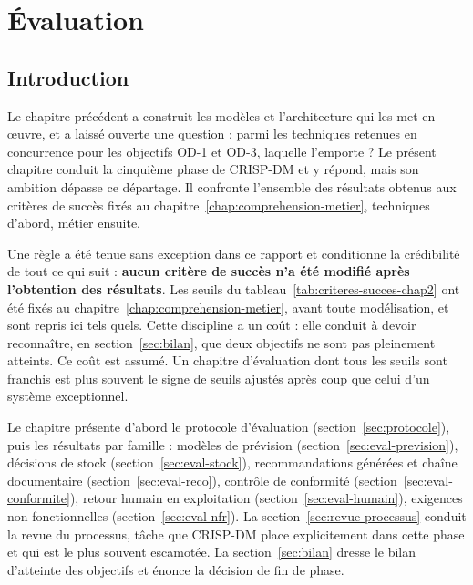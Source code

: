 %

\chapter{Évaluation}
\label{chap:evaluation}

\section*{Introduction}

Le chapitre précédent a construit les modèles et l'architecture qui les met en œuvre, et a laissé ouverte une question : parmi les techniques retenues en concurrence pour les objectifs OD-1 et OD-3, laquelle l'emporte ? Le présent chapitre conduit la cinquième phase de CRISP-DM et y répond, mais son ambition dépasse ce départage. Il confronte l'ensemble des résultats obtenus aux critères de succès fixés au chapitre~\ref{chap:comprehension-metier}, techniques d'abord, métier ensuite.

Une règle a été tenue sans exception dans ce rapport et conditionne la crédibilité de tout ce qui suit : \textbf{aucun critère de succès n'a été modifié après l'obtention des résultats}. Les seuils du tableau~\ref{tab:criteres-succes-chap2} ont été fixés au chapitre~\ref{chap:comprehension-metier}, avant toute modélisation, et sont repris ici tels quels. Cette discipline a un coût : elle conduit à devoir reconnaître, en section~\ref{sec:bilan}, que deux objectifs ne sont pas pleinement atteints. Ce coût est assumé. Un chapitre d'évaluation dont tous les seuils sont franchis est plus souvent le signe de seuils ajustés après coup que celui d'un système exceptionnel.

Le chapitre présente d'abord le protocole d'évaluation (section~\ref{sec:protocole}), puis les résultats par famille : modèles de prévision (section~\ref{sec:eval-prevision}), décisions de stock (section~\ref{sec:eval-stock}), recommandations générées et chaîne documentaire (section~\ref{sec:eval-reco}), contrôle de conformité (section~\ref{sec:eval-conformite}), retour humain en exploitation (section~\ref{sec:eval-humain}), exigences non fonctionnelles (section~\ref{sec:eval-nfr}). La section~\ref{sec:revue-processus} conduit la revue du processus, tâche que CRISP-DM place explicitement dans cette phase et qui est le plus souvent escamotée. La section~\ref{sec:bilan} dresse le bilan d'atteinte des objectifs et énonce la décision de fin de phase.

